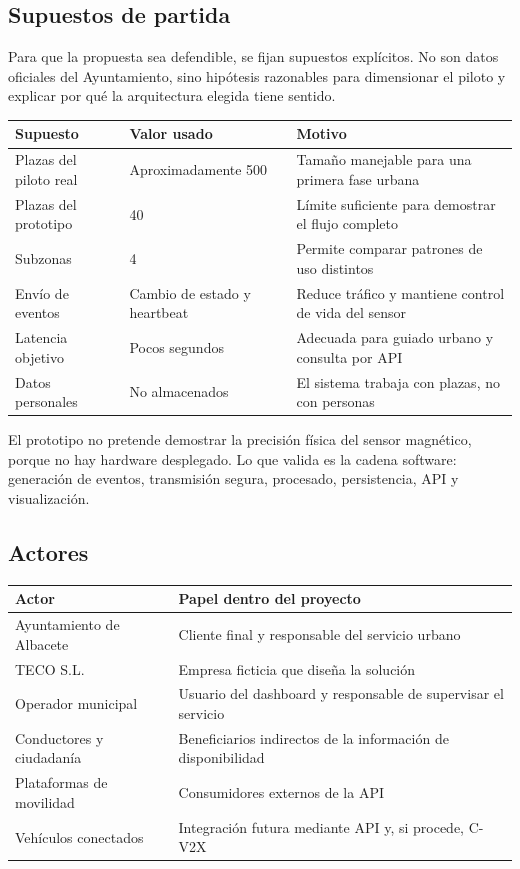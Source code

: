 \documentclass[11pt,a4paper]{article}
\begin{document}
\subsection{Supuestos de partida}

Para que la propuesta sea defendible, se fijan supuestos explícitos. No son datos oficiales del Ayuntamiento, sino hipótesis razonables para dimensionar el piloto y explicar por qué la arquitectura elegida tiene sentido.

\begin{longtable}{P{4.4cm}P{4cm}P{6.3cm}}
\toprule
\textbf{Supuesto} & \textbf{Valor usado} & \textbf{Motivo} \\
\midrule
\endhead
Plazas del piloto real & Aproximadamente 500 & Tamaño manejable para una primera fase urbana \\
Plazas del prototipo & 40 & Límite suficiente para demostrar el flujo completo \\
Subzonas & 4 & Permite comparar patrones de uso distintos \\
Envío de eventos & Cambio de estado y heartbeat & Reduce tráfico y mantiene control de vida del sensor \\
Latencia objetivo & Pocos segundos & Adecuada para guiado urbano y consulta por API \\
Datos personales & No almacenados & El sistema trabaja con plazas, no con personas \\
\bottomrule
\end{longtable}

El prototipo no pretende demostrar la precisión física del sensor magnético, porque no hay hardware desplegado. Lo que valida es la cadena software: generación de eventos, transmisión segura, procesado, persistencia, API y visualización.

\subsection{Actores}
\begin{longtable}{P{4.2cm}P{10.5cm}}
\toprule
\textbf{Actor} & \textbf{Papel dentro del proyecto} \\
\midrule
\endhead
Ayuntamiento de Albacete & Cliente final y responsable del servicio urbano \\
TECO S.L. & Empresa ficticia que diseña la solución \\
Operador municipal & Usuario del dashboard y responsable de supervisar el servicio \\
Conductores y ciudadanía & Beneficiarios indirectos de la información de disponibilidad \\
Plataformas de movilidad & Consumidores externos de la API \\
Vehículos conectados & Integración futura mediante API y, si procede, C-V2X \\
\bottomrule
\end{longtable}
\end{document}
